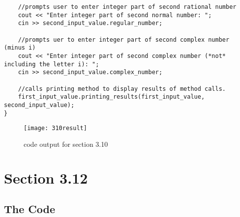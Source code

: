 \documentclass[11pt]{article}
\begin{document}
\begin{lstlisting}
    //prompts user to enter integer part of second rational number
    cout << "Enter integer part of second normal number: ";
    cin >> second_input_value.regular_number;

    //prompts uer to enter integer part of second complex number (minus i)
    cout << "Enter integer part of second complex number (*not* including the letter i): ";
    cin >> second_input_value.complex_number;

    //calls printing method to display results of method calls.
    first_input_value.printing_results(first_input_value, second_input_value);
}

\end{lstlisting}

\begin{figure}[h]
    \centering
    \texttt{[image: 310result]}
    \caption{code output for section 3.10}
    \label{fig:my_label}
\end{figure}


\section*{Section 3.12}

\subsection*{The Code}
\end{document}
